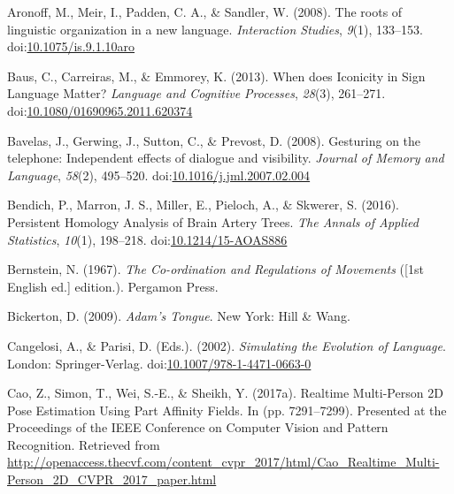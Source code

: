 \documentclass[
  man, noextraspace,floatsintext]{apa6}
\newlength{\cslhangindent}
\newenvironment{cslreferences}%
  {\setlength{\parindent}{0pt}%
  \everypar{\setlength{\hangindent}{\cslhangindent}}\ignorespaces}%
  {\par}
\begin{document}
\hypertarget{refs}{}
\begin{cslreferences}
\leavevmode\hypertarget{ref-aronoffRootsLinguisticOrganization2008}{}%
Aronoff, M., Meir, I., Padden, C. A., \& Sandler, W. (2008). The roots of linguistic organization in a new language. \emph{Interaction Studies}, \emph{9}(1), 133--153. doi:\href{https://doi.org/10.1075/is.9.1.10aro}{10.1075/is.9.1.10aro}

\leavevmode\hypertarget{ref-bausWhenDoesIconicity2013}{}%
Baus, C., Carreiras, M., \& Emmorey, K. (2013). When does Iconicity in Sign Language Matter? \emph{Language and Cognitive Processes}, \emph{28}(3), 261--271. doi:\href{https://doi.org/10.1080/01690965.2011.620374}{10.1080/01690965.2011.620374}

\leavevmode\hypertarget{ref-bavelasGesturingTelephoneIndependent2008}{}%
Bavelas, J., Gerwing, J., Sutton, C., \& Prevost, D. (2008). Gesturing on the telephone: Independent effects of dialogue and visibility. \emph{Journal of Memory and Language}, \emph{58}(2), 495--520. doi:\href{https://doi.org/10.1016/j.jml.2007.02.004}{10.1016/j.jml.2007.02.004}

\leavevmode\hypertarget{ref-bendichPersistentHomologyAnalysis2016}{}%
Bendich, P., Marron, J. S., Miller, E., Pieloch, A., \& Skwerer, S. (2016). Persistent Homology Analysis of Brain Artery Trees. \emph{The Annals of Applied Statistics}, \emph{10}(1), 198--218. doi:\href{https://doi.org/10.1214/15-AOAS886}{10.1214/15-AOAS886}

\leavevmode\hypertarget{ref-bernsteinCoordinationRegulationsMovements1967}{}%
Bernstein, N. (1967). \emph{The Co-ordination and Regulations of Movements} ({[}1st English ed.{]} edition.). Pergamon Press.

\leavevmode\hypertarget{ref-bickertonAdamTongue2009}{}%
Bickerton, D. (2009). \emph{Adam's Tongue}. New York: Hill \& Wang.

\leavevmode\hypertarget{ref-cangelosiSimulatingEvolutionLanguage2002}{}%
Cangelosi, A., \& Parisi, D. (Eds.). (2002). \emph{Simulating the Evolution of Language}. London: Springer-Verlag. doi:\href{https://doi.org/10.1007/978-1-4471-0663-0}{10.1007/978-1-4471-0663-0}

\leavevmode\hypertarget{ref-caoRealtimeMultiPerson2D2017}{}%
Cao, Z., Simon, T., Wei, S.-E., \& Sheikh, Y. (2017a). Realtime Multi-Person 2D Pose Estimation Using Part Affinity Fields. In (pp. 7291--7299). Presented at the Proceedings of the IEEE Conference on Computer Vision and Pattern Recognition. Retrieved from \url{http://openaccess.thecvf.com/content_cvpr_2017/html/Cao_Realtime_Multi-Person_2D_CVPR_2017_paper.html}


\end{cslreferences}
\end{document}
